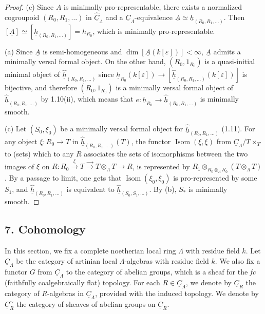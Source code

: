 \documentclass[11pt]{article}
\theoremstyle{plain}
\theoremstyle{definition}
\theoremstyle{remark}
\DeclareMathOperator{\Isom}{Isom}
\newcommand{\uA}{\underline{A}}\newcommand{\uH}{\underline{H}}\newcommand{\uExt}{\underline{\operatorname{Ext}}}\newcommand{\uL}{\underline{L}}\newcommand{\uM}{\underline{M}}\newcommand{\uZ}{\underline{Z}}\newcommand{\uB}{\underline{B}}\newcommand{\uC}{\underline{C}}\newcommand{\uD}{\underline{D}}\newcommand{\uE}{\underline{E}}\newcommand{\uG}{\underline{G}}\newcommand{\uP}{\underline{P}}\newcommand{\uQ}{\underline{Q}}
\begin{document}
\begin{proof}
(c) Since $\uA$ is minimally pro-representable, there exists a normalized cogroupoid $(R_0, R_1, \ldots)$ in $\widehat{\underline{C}}_{\Lambda}$ and a $\underline{C}_{\Lambda}$-equivalence $\uA \simeq \underline{h}_{(R_0, R_1, \ldots)}$. Then $[\uA] \simeq [\underline{h}_{(R_0, R_1, \ldots)}] = h_{R_0}$, which is minimally pro-representable.

(a) Since $\uA$ is semi-homogeneous and $\dim [\uA(k[\varepsilon])] < \infty$, $\uA$ admits a minimally versal formal object. On the other hand, $(R_0, 1_{R_0})$ is a quasi-initial minimal object of $\widehat{\underline{h}}_{(R_0, R_1, \ldots)}$ since $\underline{h}_{R_0}(k[\varepsilon]) \to [\widehat{\underline{h}}_{(R_0, R_1, \ldots)}(k[\varepsilon])]$ is bijective, and therefore $(R_0, 1_{R_0})$ is a minimally versal formal object of $\widehat{\underline{h}}_{(R_0, R_1, \ldots)}$ by 1.10(ii), which means that $e : \underline{h}_{R_0} \longrightarrow \widehat{\underline{h}}_{(R_0, R_1, \ldots)}$ is minimally smooth.

(c) Let $(S_0, \xi_0)$ be a minimally versal formal object for $\widehat{\underline{h}}_{(R_0, R_1, \ldots)}$ (1.11). For any object $\xi : R_0 \to T$ in $\widehat{\underline{h}}_{(R_0, R_1, \ldots)}(T)$, the functor $\Isom(\xi, \xi)$ from $\underline{C}_{\Lambda}/T \times_T$ to (sets) which to any $R$ associates the sets of isomorphisms between the two images of $\xi$ on $R : R_0 \xrightarrow{\xi} T \xrightarrow{\longrightarrow} T \otimes_{\Lambda} T \longrightarrow R$, is represented by $R_1 \otimes_{R_0 \otimes_{\Lambda} R_0} (T \otimes_{\Lambda} T)$. By a passage to limit, one gets that $\Isom(\xi_0, \xi_0)$ is pro-represented by some $S_1$, and $\widehat{\underline{h}}_{(R_0, R_1, \ldots)}$ is equivalent to $\widehat{\underline{h}}_{(S_0, S_1, \ldots)}$. By (b), $S_*$ is minimally smooth.
\end{proof}

\subsection*{7. Cohomology}

In this section, we fix a complete noetherian local ring $\Lambda$ with residue field $k$. Let $\underline{C}_{\Lambda}$ be the category of artinian local $\Lambda$-algebras with residue field $k$. We also fix a functor $G$ from $\underline{C}_{\Lambda}$ to the category of abelian groups, which is a sheaf for the \emph{fc} (faithfully coalgebraically flat) topology. For each $R \in \underline{C}_{\Lambda}$, we denote by $\underline{C}_{R}$ the category of $R$-algebras in $\underline{C}_{\Lambda}$, provided with the induced topology. We denote by $\underline{C}_{R}^{\sim}$ the category of sheaves of abelian groups on $\underline{C}_{R}$.
\end{document}
